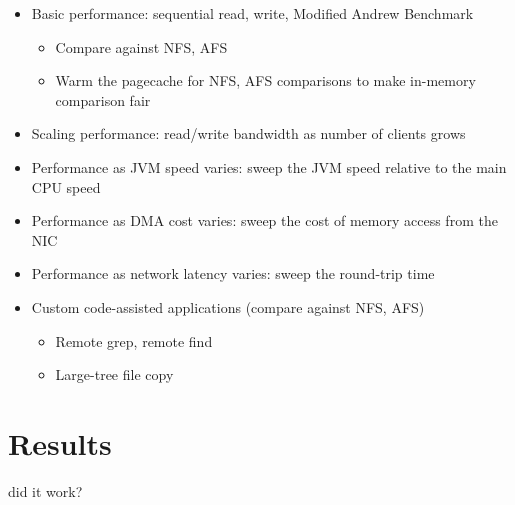 \documentclass[10pt]{article}
\begin{document}
\begin{itemize}
\begin{itemize}
\begin{itemize}
\item Basic performance: sequential read, write, Modified Andrew
  Benchmark
\begin{itemize}
\item Compare against NFS, AFS
\item Warm the pagecache for NFS, AFS comparisons to make in-memory
  comparison fair
\end{itemize}
\item Scaling performance: read/write bandwidth as number of clients grows
\item Performance as JVM speed varies: sweep the JVM speed relative to
  the main CPU speed
\item Performance as DMA cost varies: sweep the cost of memory access
  from the NIC
\item Performance as network latency varies: sweep the round-trip time
\item Custom code-assisted applications (compare against NFS, AFS)
\begin{itemize}
\item Remote grep, remote find
\item Large-tree file copy
\end{itemize}
\end{itemize}

\section{Results}
did it work?



\end{itemize}
\end{itemize}
\end{document}
